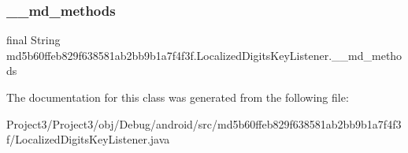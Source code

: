 \subsubsection{\texorpdfstring{\+\_\+\+\_\+md\+\_\+methods}{\_\_md\_methods}}
{\footnotesize\ttfamily final String md5b60ffeb829f638581ab2bb9b1a7f4f3f.\+Localized\+Digits\+Key\+Listener.\+\_\+\+\_\+md\+\_\+methods\hspace{0.3cm}{\ttfamily [static]}}



The documentation for this class was generated from the following file\+:\begin{DoxyCompactItemize}
\item 
Project3/\+Project3/obj/\+Debug/android/src/md5b60ffeb829f638581ab2bb9b1a7f4f3f/Localized\+Digits\+Key\+Listener.\+java\end{DoxyCompactItemize}
